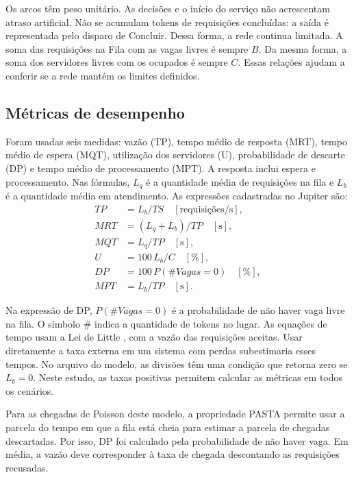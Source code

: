 \documentclass[10pt]{ieeeconf}
\newcommand{\mq}{L_q}
\newcommand{\mb}{L_b}
\begin{document}
Os arcos têm peso unitário. As decisões e o início do serviço não acrescentam atraso artificial. Não se acumulam tokens de requisições concluídas: a saída é representada pelo disparo de Concluir. Dessa forma, a rede continua limitada. A soma das requisições na Fila com as vagas livres é sempre $B$. Da mesma forma, a soma dos servidores livres com os ocupados é sempre $C$. Essas relações ajudam a conferir se a rede mantém os limites definidos.

\subsection{Métricas de desempenho}
Foram usadas seis medidas: vazão (TP), tempo médio de resposta (MRT), tempo médio de espera (MQT), utilização dos servidores (U), probabilidade de descarte (DP) e tempo médio de processamento (MPT). A resposta inclui espera e processamento. Nas fórmulas, $\mq$ é a quantidade média de requisições na fila e $\mb$ é a quantidade média em atendimento. As expressões cadastradas no Jupiter são:
\begin{align}
TP &= \mb/TS \quad [\text{requisições/s}],\label{eq:tp}\\
MRT &= (\mq+\mb)/TP \quad [\text{s}],\label{eq:mrt}\\
MQT &= \mq/TP \quad [\text{s}],\label{eq:mqt}\\
U &= 100\,\mb/C \quad [\%],\label{eq:u}\\
DP &= 100\,P(\#Vagas=0) \quad [\%],\label{eq:dp}\\
MPT &= \mb/TP \quad [\text{s}].\label{eq:mpt}
\end{align}

Na expressão de DP, $P(\#Vagas=0)$ é a probabilidade de não haver vaga livre na fila. O símbolo $\#$ indica a quantidade de tokens no lugar. As equações de tempo usam a Lei de Little \cite{little}, com a vazão das requisições aceitas. Usar diretamente a taxa externa em um sistema com perdas subestimaria esses tempos. No arquivo do modelo, as divisões têm uma condição que retorna zero se $\mb=0$. Neste estudo, as taxas positivas permitem calcular as métricas em todos os cenários.

Para as chegadas de Poisson deste modelo, a propriedade PASTA \cite{wolff} permite usar a parcela do tempo em que a fila está cheia para estimar a parcela de chegadas descartadas. Por isso, DP foi calculado pela probabilidade de não haver vaga. Em média, a vazão deve corresponder à taxa de chegada descontando as requisições recusadas.
\end{document}
